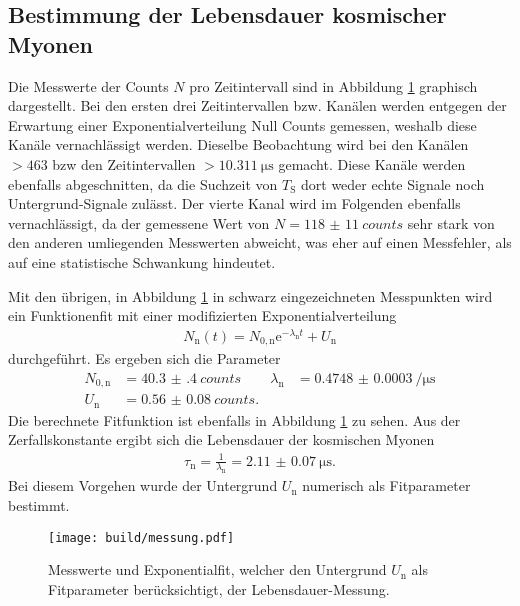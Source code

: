 \subsection{Bestimmung der Lebensdauer kosmischer Myonen}

Die Messwerte der Counts $N$ pro Zeitintervall sind in Abbildung \ref{fig:messung} graphisch dargestellt.
Bei den ersten drei Zeitintervallen bzw. Kanälen werden entgegen der Erwartung einer Exponentialverteilung Null Counts gemessen,
weshalb diese Kanäle vernachlässigt werden. Dieselbe Beobachtung wird bei den Kanälen $>463$ bzw den Zeitintervallen
$>\SI{10.311}{\micro\second}$ gemacht. Diese Kanäle werden ebenfalls abgeschnitten, da die Suchzeit von $T_\text{S}$ dort weder echte Signale
noch Untergrund-Signale zulässt. Der vierte Kanal wird im Folgenden ebenfalls vernachlässigt, da der gemessene Wert
von $N = \SI{118(11)}{counts}$ sehr stark von den anderen umliegenden Messwerten abweicht, was eher auf einen Messfehler, als auf eine
statistische Schwankung hindeutet.

Mit den übrigen, in Abbildung \ref{fig:messung} in schwarz eingezeichneten Messpunkten wird ein Funktionenfit mit einer modifizierten Exponentialverteilung
\begin{align}
  N_\text{n}(t) = N_{0,\text{n}} \mathrm{e}^{-\lambda_\text{n} t} + U_\text{n}
\end{align}
durchgeführt. Es ergeben sich die Parameter
\begin{align}
  N_{0,\text{n}} &= \SI{40.3(4)}{counts} & \lambda_\text{n} &= \SI{0.4748(3)}{\per\micro\second} \\
  U_\text{n} &= \SI{0.56(8)}{counts}. & &
  \label{eqn:Unum}
\end{align}
Die berechnete Fitfunktion ist ebenfalls in Abbildung \ref{fig:messung} zu sehen.
Aus der Zerfallskonstante ergibt sich die Lebensdauer der kosmischen Myonen
\begin{align}
  \tau_\text{n} = \frac1{\lambda_\text{n}} = \SI{2.11(7)}{\micro\second}.
\end{align}
Bei diesem Vorgehen wurde der Untergrund $U_\text{n}$ numerisch als Fitparameter bestimmt.

\begin{figure}[h]
  \centering
  \texttt{[image: build/messung.pdf]}
  \caption{Messwerte und Exponentialfit, welcher den Untergrund $U_\text{n}$ als Fitparameter berücksichtigt, der Lebensdauer-Messung.}
  \label{fig:messung}
\end{figure}


